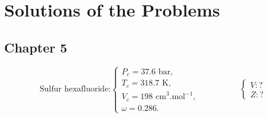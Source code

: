 \chapter{Solutions of the Problems}\label{Appendix_Solutions}


\localtableofcontents



\section{Chapter 5}\label{Appendix_Solutions:Chapter5}

%
  \begin{probsol}\label{Chapter:VolumetricPropertiesPureSubstances:Problem:01:solution} %
     \begin{displaymath}
        \text{Sulfur hexafluoride:} \begin{cases}
             P_{c} = \text{37.6 bar}, \\
             T_{c} = \text{318.7 K}, \\
             V_{c} = \text{198 cm}^{3}\text{.mol}^{-1},\\
             \omega = \text{0.286}.
             \end{cases} \hspace{2cm} \begin{cases} V:? \\ Z:? \end{cases}
     \end{displaymath}
   

\end{probsol}
